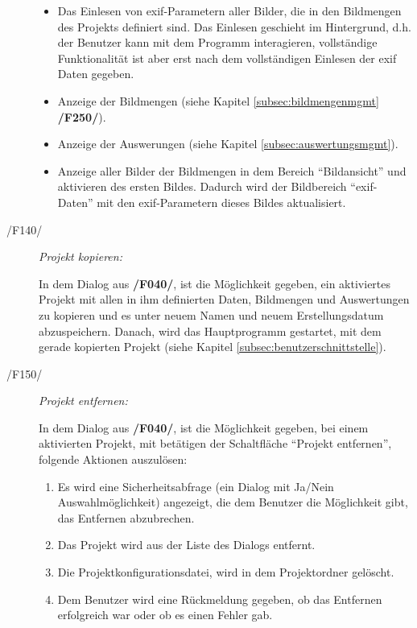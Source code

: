 \begin{description}
\begin{itemize}
				\item Das Einlesen von \gls{exif}-Parametern aller Bilder, die in den Bildmengen des Projekts definiert sind. Das Einlesen geschieht im Hintergrund, d.h. der Benutzer kann mit dem Programm interagieren, vollständige Funktionalität ist aber erst nach dem vollständigen Einlesen der \gls{exif} Daten gegeben.
				
				\item Anzeige der Bildmengen (siehe Kapitel \ref{subsec:bildmengenmgmt} \textbf{/F250/}).
				
				\item Anzeige der Auswerungen (siehe Kapitel \ref{subsec:auswertungsmgmt}).
				
				\item Anzeige aller Bilder der Bildmengen in dem Bereich "`Bildansicht"' und aktivieren des ersten Bildes. Dadurch wird der Bildbereich "`\gls{exif}-Daten"' mit den \gls{exif}-Parametern dieses Bildes aktualisiert.
			
			\end{itemize}		
		
		\item[/F140/] \textit{Projekt kopieren:}\par In dem Dialog aus \textbf{/F040/}, ist die Möglichkeit gegeben, ein aktiviertes Projekt mit allen in ihm definierten Daten, Bildmengen und Auswertungen zu kopieren und es unter neuem Namen und neuem Erstellungsdatum abzuspeichern. Danach, wird das Hauptprogramm gestartet, mit dem gerade kopierten Projekt (siehe Kapitel \ref{subsec:benutzerschnittstelle}).
		
		\item[/F150/] \textit{Projekt entfernen:}\par In dem Dialog aus \textbf{/F040/}, ist die Möglichkeit gegeben, bei einem aktivierten Projekt, mit betätigen der Schaltfläche "`Projekt entfernen"', folgende Aktionen auszulösen:
			
			\begin{enumerate}
				
				\item Es wird eine Sicherheitsabfrage (ein Dialog mit Ja/Nein Auswahlmöglichkeit) angezeigt, die dem Benutzer die Möglichkeit gibt, das Entfernen abzubrechen.
				
				\item Das Projekt wird aus der Liste des Dialogs entfernt.
				
				\item Die Projektkonfigurationsdatei, wird in dem Projektordner gelöscht.
				
				\item Dem Benutzer wird eine Rückmeldung gegeben, ob das Entfernen erfolgreich war oder ob es einen Fehler gab.
			
			\end{enumerate}
	
	\end{description}

